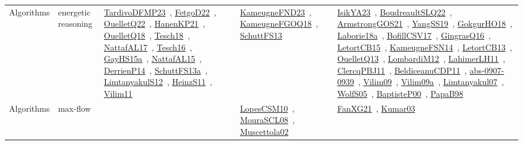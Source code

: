 {\begin{longtable}{lp{3cm}>{\raggedright\arraybackslash}p{6cm}>{\raggedright\arraybackslash}p{6cm}>{\raggedright\arraybackslash}p{8cm}}
Algorithms & energetic reasoning & \href{works/TardivoDFMP23.pdf}{TardivoDFMP23}~\cite{TardivoDFMP23}, \href{works/FetgoD22.pdf}{FetgoD22}~\cite{FetgoD22}, \href{works/OuelletQ22.pdf}{OuelletQ22}~\cite{OuelletQ22}, \href{works/HanenKP21.pdf}{HanenKP21}~\cite{HanenKP21}, \href{works/OuelletQ18.pdf}{OuelletQ18}~\cite{OuelletQ18}, \href{works/Tesch18.pdf}{Tesch18}~\cite{Tesch18}, \href{works/NattafAL17.pdf}{NattafAL17}~\cite{NattafAL17}, \href{works/Tesch16.pdf}{Tesch16}~\cite{Tesch16}, \href{works/GayHS15a.pdf}{GayHS15a}~\cite{GayHS15a}, \href{works/NattafAL15.pdf}{NattafAL15}~\cite{NattafAL15}, \href{works/DerrienP14.pdf}{DerrienP14}~\cite{DerrienP14}, \href{works/SchuttFS13a.pdf}{SchuttFS13a}~\cite{SchuttFS13a}, \href{works/LimtanyakulS12.pdf}{LimtanyakulS12}~\cite{LimtanyakulS12}, \href{works/HeinzS11.pdf}{HeinzS11}~\cite{HeinzS11}, \href{works/Vilim11.pdf}{Vilim11}~\cite{Vilim11} & \href{works/KameugneFND23.pdf}{KameugneFND23}~\cite{KameugneFND23}, \href{works/KameugneFGOQ18.pdf}{KameugneFGOQ18}~\cite{KameugneFGOQ18}, \href{works/SchuttFS13.pdf}{SchuttFS13}~\cite{SchuttFS13} & \href{works/IsikYA23.pdf}{IsikYA23}~\cite{IsikYA23}, \href{works/BoudreaultSLQ22.pdf}{BoudreaultSLQ22}~\cite{BoudreaultSLQ22}, \href{works/ArmstrongGOS21.pdf}{ArmstrongGOS21}~\cite{ArmstrongGOS21}, \href{works/YangSS19.pdf}{YangSS19}~\cite{YangSS19}, \href{works/GokgurHO18.pdf}{GokgurHO18}~\cite{GokgurHO18}, \href{works/Laborie18a.pdf}{Laborie18a}~\cite{Laborie18a}, \href{works/BofillCSV17.pdf}{BofillCSV17}~\cite{BofillCSV17}, \href{works/GingrasQ16.pdf}{GingrasQ16}~\cite{GingrasQ16}, \href{works/LetortCB15.pdf}{LetortCB15}~\cite{LetortCB15}, \href{works/KameugneFSN14.pdf}{KameugneFSN14}~\cite{KameugneFSN14}, \href{works/LetortCB13.pdf}{LetortCB13}~\cite{LetortCB13}, \href{works/OuelletQ13.pdf}{OuelletQ13}~\cite{OuelletQ13}, \href{works/LombardiM12.pdf}{LombardiM12}~\cite{LombardiM12}, \href{works/LahimerLH11.pdf}{LahimerLH11}~\cite{LahimerLH11}, \href{works/ClercqPBJ11.pdf}{ClercqPBJ11}~\cite{ClercqPBJ11}, \href{works/BeldiceanuCDP11.pdf}{BeldiceanuCDP11}~\cite{BeldiceanuCDP11}, \href{works/abs-0907-0939.pdf}{abs-0907-0939}~\cite{abs-0907-0939}, \href{works/Vilim09.pdf}{Vilim09}~\cite{Vilim09}, \href{works/Vilim09a.pdf}{Vilim09a}~\cite{Vilim09a}, \href{works/Limtanyakul07.pdf}{Limtanyakul07}~\cite{Limtanyakul07}, \href{works/WolfS05.pdf}{WolfS05}~\cite{WolfS05}, \href{works/BaptisteP00.pdf}{BaptisteP00}~\cite{BaptisteP00}, \href{works/PapaB98.pdf}{PapaB98}~\cite{PapaB98}\\
Algorithms & max-flow &  & \href{works/LopesCSM10.pdf}{LopesCSM10}~\cite{LopesCSM10}, \href{works/MouraSCL08.pdf}{MouraSCL08}~\cite{MouraSCL08}, \href{works/Muscettola02.pdf}{Muscettola02}~\cite{Muscettola02} & \href{works/FanXG21.pdf}{FanXG21}~\cite{FanXG21}, \href{works/Kumar03.pdf}{Kumar03}~\cite{Kumar03}\\

\end{longtable}}
